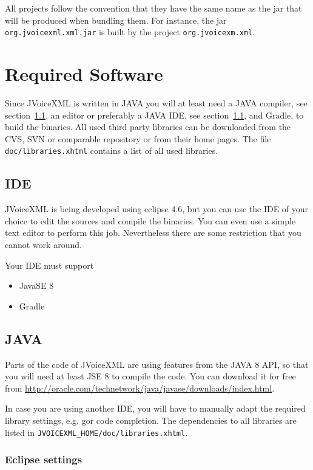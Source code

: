 \documentclass[11pt,a4paper]{article}
\begin{document}
All projects follow the convention that they have the same name as the jar
that will be produced when bundling them. For instance, the jar \lstinline{org.jvoicexml.xml.jar}
is built by the project \lstinline{org.jvoicexm.xml}.

\section{Required Software}
\label{sec:required-software}

Since JVoiceXML is written in JAVA you will at least need a
JAVA compiler, see section~\ref{sec:ide}, an editor or preferably a JAVA
IDE, see section~\ref{sec:ide}, and Gradle, to build the
binaries. All used third party libraries can be downloaded from the CVS, SVN or
comparable repository or from their home pages. The file
\texttt{doc/libraries.xhtml} contains a list of all used libraries.


\subsection{IDE}
\label{sec:ide}

JVoiceXML is being developed using eclipse 4.6, but you can use the IDE of your
choice to edit the sources and compile the binaries. You can even use a simple
text editor to perform this job. Nevertheless there are some restriction that
you cannot work around.

Your IDE must support

\begin{itemize}
\item JavaSE 8
\item Gradle
\end{itemize}

\subsection{JAVA}
\label{sec:java}

Parts of the code of JVoiceXML are using features from the JAVA 8 API, so that
you will need at least JSE 8 to compile the code. You can download it
for free from \url{http://oracle.com/technetwork/java/javase/downloads/index.html}.

In case you are using another IDE, you will have to manually adapt
the required library settings, e.g. gor code completion. The dependencies to all
libraries are listed in \lstinline{JVOICEXML_HOME/doc/libraries.xhtml}.


\subsubsection{Eclipse settings}
\label{sec:eclipse}
\end{document}
